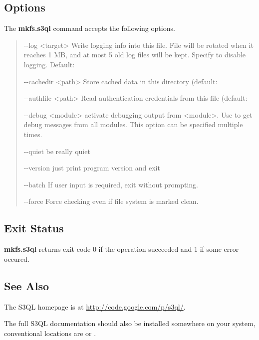 \documentclass[letterpaper,10pt,english]{sphinxmanual}
\begin{document}
\subsection{Options}
\label{man/fsck:options}
The \textbf{mkfs.s3ql} command accepts the following options.
\begin{quote}
\begin{optionlist}{3cm}
\item [-{-}log \textless{}target\textgreater{}]  
Write logging info into this file. File will be rotated
when it reaches 1 MB, and at most 5 old log files will be
kept. Specify  to disable logging. Default:
\item [-{-}cachedir \textless{}path\textgreater{}]  
Store cached data in this directory (default: 
\item [-{-}authfile \textless{}path\textgreater{}]  
Read authentication credentials from this file (default:
\item [-{-}debug \textless{}module\textgreater{}]  
activate debugging output from \textless{}module\textgreater{}. Use  to get
debug messages from all modules. This option can be
specified multiple times.
\item [-{-}quiet]  
be really quiet
\item [-{-}version]  
just print program version and exit
\item [-{-}batch]  
If user input is required, exit without prompting.
\item [-{-}force]  
Force checking even if file system is marked clean.
\end{optionlist}
\end{quote}


\subsection{Exit Status}
\label{man/fsck:exit-status}
\textbf{mkfs.s3ql} returns exit code 0 if the operation succeeded and 1 if some
error occured.


\subsection{See Also}
\label{man/fsck:see-also}
The S3QL homepage is at \href{http://code.google.com/p/s3ql/}{http://code.google.com/p/s3ql/}.

The full S3QL documentation should also be installed somewhere on your
system, conventional locations are  or
.
\end{document}
